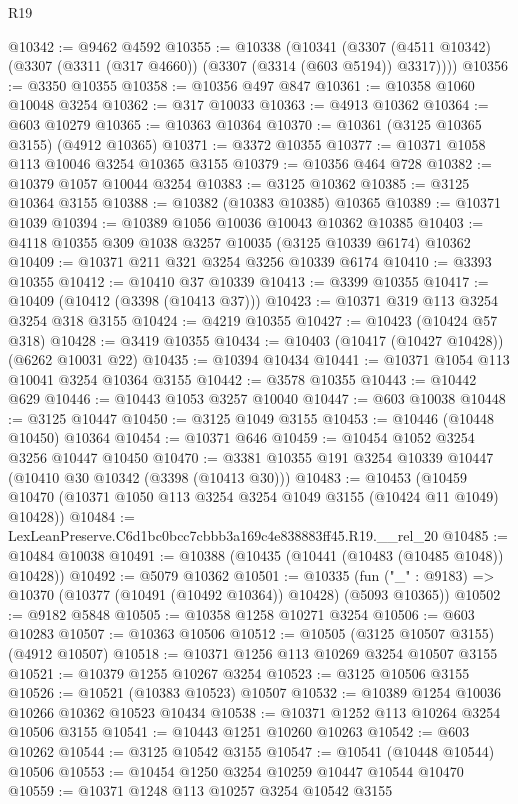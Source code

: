 \begin{lexlean}{R19}
\begin{coremodule}
@10342 := @9462 @4592
@10355 := @10338
    (@10341 (@3307 (@4511 @10342) (@3307 (@3311 (@317 @4660)) (@3307 (@3314 (@603 @5194)) @3317))))
@10356 := @3350 @10355
@10358 := @10356 @497 @847
@10361 := @10358 @1060 @10048 @3254
@10362 := @317 @10033
@10363 := @4913 @10362
@10364 := @603 @10279
@10365 := @10363 @10364
@10370 := @10361 (@3125 @10365 @3155) (@4912 @10365)
@10371 := @3372 @10355
@10377 := @10371 @1058 @113 @10046 @3254 @10365 @3155
@10379 := @10356 @464 @728
@10382 := @10379 @1057 @10044 @3254
@10383 := @3125 @10362
@10385 := @3125 @10364 @3155
@10388 := @10382 (@10383 @10385) @10365
@10389 := @10371 @1039
@10394 := @10389 @1056 @10036 @10043 @10362 @10385
@10403 := @4118 @10355 @309 @1038 @3257 @10035 (@3125 @10339 @6174) @10362
@10409 := @10371 @211 @321 @3254 @3256 @10339 @6174
@10410 := @3393 @10355
@10412 := @10410 @37 @10339
@10413 := @3399 @10355
@10417 := @10409 (@10412 (@3398 (@10413 @37)))
@10423 := @10371 @319 @113 @3254 @3254 @318 @3155
@10424 := @4219 @10355
@10427 := @10423 (@10424 @57 @318)
@10428 := @3419 @10355
@10434 := @10403 (@10417 (@10427 @10428)) (@6262 @10031 @22)
@10435 := @10394 @10434
@10441 := @10371 @1054 @113 @10041 @3254 @10364 @3155
@10442 := @3578 @10355
@10443 := @10442 @629
@10446 := @10443 @1053 @3257 @10040
@10447 := @603 @10038
@10448 := @3125 @10447
@10450 := @3125 @1049 @3155
@10453 := @10446 (@10448 @10450) @10364
@10454 := @10371 @646
@10459 := @10454 @1052 @3254 @3256 @10447 @10450
@10470 := @3381 @10355 @191 @3254 @10339 @10447 (@10410 @30 @10342 (@3398 (@10413 @30)))
@10483 := @10453
    (@10459 @10470 (@10371 @1050 @113 @3254 @3254 @1049 @3155 (@10424 @11 @1049) @10428))
@10484 := LexLeanPreserve.C6d1bc0bcc7cbbb3a169c4e838883ff45.R19.__rel_20
@10485 := @10484 @10038
@10491 := @10388 (@10435 (@10441 (@10483 (@10485 @1048)) @10428))
@10492 := @5079 @10362
@10501 := @10335
    (fun ("_" : @9183) => @10370 (@10377 (@10491 (@10492 @10364)) @10428) (@5093 @10365))
@10502 := @9182 @5848
@10505 := @10358 @1258 @10271 @3254
@10506 := @603 @10283
@10507 := @10363 @10506
@10512 := @10505 (@3125 @10507 @3155) (@4912 @10507)
@10518 := @10371 @1256 @113 @10269 @3254 @10507 @3155
@10521 := @10379 @1255 @10267 @3254
@10523 := @3125 @10506 @3155
@10526 := @10521 (@10383 @10523) @10507
@10532 := @10389 @1254 @10036 @10266 @10362 @10523 @10434
@10538 := @10371 @1252 @113 @10264 @3254 @10506 @3155
@10541 := @10443 @1251 @10260 @10263
@10542 := @603 @10262
@10544 := @3125 @10542 @3155
@10547 := @10541 (@10448 @10544) @10506
@10553 := @10454 @1250 @3254 @10259 @10447 @10544 @10470
@10559 := @10371 @1248 @113 @10257 @3254 @10542 @3155

\end{coremodule}
\end{lexlean}
